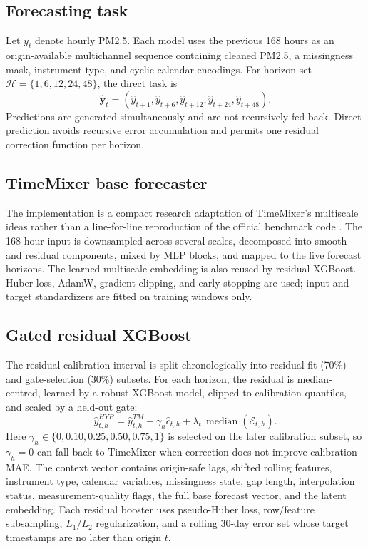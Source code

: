 \documentclass[sn-mathphys-num]{sn-jnl}
\newcommand{\Horizons}{\{1,6,12,24,48\}}
\begin{document}
\subsection{Forecasting task}
\label{sec:problem}

Let \(y_t\) denote hourly PM2.5. Each model uses the previous 168 hours as an
origin-available multichannel sequence containing cleaned PM2.5, a missingness
mask, instrument type, and cyclic calendar encodings. For horizon set
\(\mathcal H=\Horizons\), the direct task is
\begin{equation}
\hat{\mathbf y}_t=
\left(\hat y_{t+1},\hat y_{t+6},\hat y_{t+12},\hat y_{t+24},\hat y_{t+48}\right).
\end{equation}
Predictions are generated simultaneously and are not recursively fed back.
Direct prediction avoids recursive error accumulation and permits one residual
correction function per horizon.

\subsection{TimeMixer base forecaster}
\label{sec:timemixer}

The implementation is a compact research adaptation of TimeMixer's multiscale
ideas rather than a line-for-line reproduction of the official benchmark code
\cite{wang2024timemixer}. The 168-hour input is downsampled across several
scales, decomposed into smooth and residual components, mixed by MLP blocks,
and mapped to the five forecast horizons. The learned multiscale embedding is
also reused by residual XGBoost. Huber loss, AdamW, gradient clipping, and
early stopping are used; input and target standardizers are fitted on training
windows only.

\subsection{Gated residual XGBoost}
\label{sec:residual}

The residual-calibration interval is split chronologically into residual-fit
(70\%) and gate-selection (30\%) subsets. For each horizon, the residual is
median-centred, learned by a robust XGBoost model, clipped to calibration
quantiles, and scaled by a held-out gate:
\begin{equation}
\hat y^{HYB}_{t,h}
=\hat y^{TM}_{t,h}
+\gamma_h\hat c_{t,h}
+\lambda_t\,\operatorname{median}(\mathcal E_{t,h}).
\end{equation}
Here \(\gamma_h\in\{0,0.10,0.25,0.50,0.75,1\}\) is selected on the later
calibration subset, so \(\gamma_h=0\) can fall back to TimeMixer when correction
does not improve calibration MAE. The context vector contains origin-safe lags,
shifted rolling features, instrument type, calendar variables, missingness
state, gap length, interpolation status, measurement-quality flags, the full
base forecast vector, and the latent embedding. Each residual booster uses
pseudo-Huber loss, row/feature subsampling, \(L_1/L_2\) regularization, and a
rolling 30-day error set whose target timestamps are no later than origin \(t\).
\end{document}
